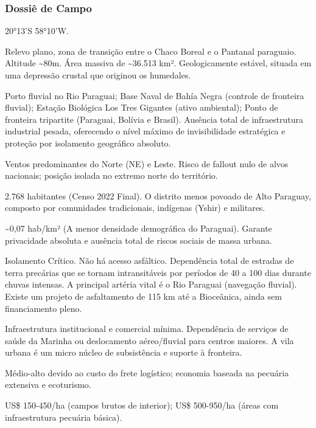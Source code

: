 \subsubsection{Dossiê de Campo}
\begin{description}[style=nextline,leftmargin=0.5cm,font=\bfseries]
\item[Coordenadas]  20°13'S 58°10'W.
\item[Topografia]  Relevo plano, zona de transição entre o Chaco Boreal e o Pantanal paraguaio. Altitude \textasciitilde 80m. Área massiva de \textasciitilde 36.513 km². Geologicamente estável, situada em uma depressão crustal que originou os humedales.
\item[Alvos Estratégicos]  Porto fluvial no Rio Paraguai; Base Naval de Bahía Negra (controle de fronteira fluvial); Estação Biológica Los Tres Gigantes (ativo ambiental); Ponto de fronteira tripartite (Paraguai, Bolívia e Brasil). Ausência total de infraestrutura industrial pesada, oferecendo o nível máximo de invisibilidade estratégica e proteção por isolamento geográfico absoluto.
\item[Fallout]  Ventos predominantes do Norte (NE) e Leste. Risco de fallout nulo de alvos nacionais; posição isolada no extremo norte do território.
\item[População]  2.768 habitantes (Censo 2022 Final). O distrito menos povoado de Alto Paraguay, composto por comunidades tradicionais, indígenas (Yshir) e militares.
\item[Densidade]  \textasciitilde 0,07 hab/\allowbreak \allowbreak km² (A menor densidade demográfica do Paraguai). Garante privacidade absoluta e ausência total de riscos sociais de massa urbana.
\item[Vias de Acesso]  Isolamento Crítico. Não há acesso asfáltico. Dependência total de estradas de terra precárias que se tornam intransitáveis por períodos de 40 a 100 dias durante chuvas intensas. A principal artéria vital é o Rio Paraguai (navegação fluvial). Existe um projeto de asfaltamento de 115 km até a Bioceânica, ainda sem financiamento pleno.
\item[Serviços]  Infraestrutura institucional e comercial mínima. Dependência de serviços de saúde da Marinha ou deslocamento aéreo/\allowbreak \allowbreak fluvial para centros maiores. A vila urbana é um micro núcleo de subsistência e suporte à fronteira.
\item[Custo de Vida]  Médio-alto devido ao custo do frete logístico; economia baseada na pecuária extensiva e ecoturismo.
\item[Preço da Terra]  US\$ 150-450/\allowbreak \allowbreak ha (campos brutos de interior); US\$ 500-950/\allowbreak \allowbreak ha (áreas com infraestrutura pecuária básica).

\end{description}
